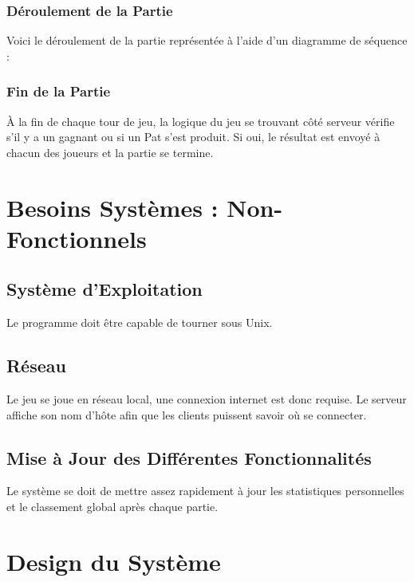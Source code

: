 \documentclass[10pt, a4paper]{article}
\begin{document}
\subsubsection{Déroulement de la Partie}
Voici le déroulement de la partie représentée à l'aide d'un diagramme de séquence : \\


\subsubsection{Fin de la Partie}
À la fin de chaque tour de jeu, la logique du jeu se trouvant côté serveur vérifie s'il y a un gagnant ou si un Pat s'est produit. Si oui, le résultat est envoyé à chacun des joueurs et la partie se termine.


\section{Besoins Systèmes : Non-Fonctionnels}


\subsection{Système d'Exploitation}
Le programme doit être capable de tourner sous Unix. \\

\subsection{Réseau}
Le jeu se joue en réseau local, une connexion internet est donc requise. Le serveur affiche son nom d'hôte afin que les clients puissent savoir où se connecter. \\

\subsection{Mise à Jour des Différentes Fonctionnalités}
Le système se doit de mettre assez rapidement à jour les statistiques personnelles et le classement global après chaque partie.

\section{Design du Système}
\end{document}
